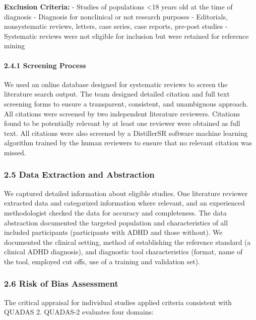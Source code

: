 \documentclass[
  12pt,
  letterpaper,
]{article}
\renewcommand{\[}{\begin{singlespace}\oldDisplayMath}
\renewcommand{\]}{\endoldDisplayMath\end{singlespace}\vspace{\baselineskip}}
\begin{document}
\textbf{Exclusion Criteria:} - Studies of populations \textless18 years
old at the time of diagnosis - Diagnosis for nonclinical or not research
purposes - Editorials, nonsystematic reviews, letters, case series, case
reports, pre-post studies - Systematic reviews were not eligible for
inclusion but were retained for reference mining

\paragraph{2.4.1 Screening Process}\label{screening-process}

We used an online database designed for systematic reviews to screen the
literature search output. The team designed detailed citation and full
text screening forms to ensure a transparent, consistent, and
unambiguous approach. All citations were screened by two independent
literature reviewers. Citations found to be potentially relevant by at
least one reviewer were obtained as full text. All citations were also
screened by a DistillerSR software machine learning algorithm trained by
the human reviewers to ensure that no relevant citation was missed.

\subsubsection{2.5 Data Extraction and
Abstraction}\label{data-extraction-and-abstraction}

We captured detailed information about eligible studies. One literature
reviewer extracted data and categorized information where relevant, and
an experienced methodologist checked the data for accuracy and
completeness. The data abstraction documented the targeted population
and characteristics of all included participants (participants with ADHD
and those without). We documented the clinical setting, method of
establishing the reference standard (a clinical ADHD diagnosis), and
diagnostic tool characteristics (format, name of the tool, employed cut
offs, use of a training and validation set).

\subsubsection{2.6 Risk of Bias
Assessment}\label{risk-of-bias-assessment}

The critical appraisal for individual studies applied criteria
consistent with QUADAS 2. QUADAS-2 evaluates four domains:
\end{document}
